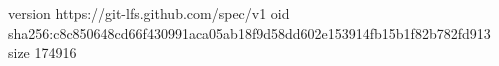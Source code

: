 version https://git-lfs.github.com/spec/v1
oid sha256:c8c850648cd66f430991aca05ab18f9d58dd602e153914fb15b1f82b782fd913
size 174916
